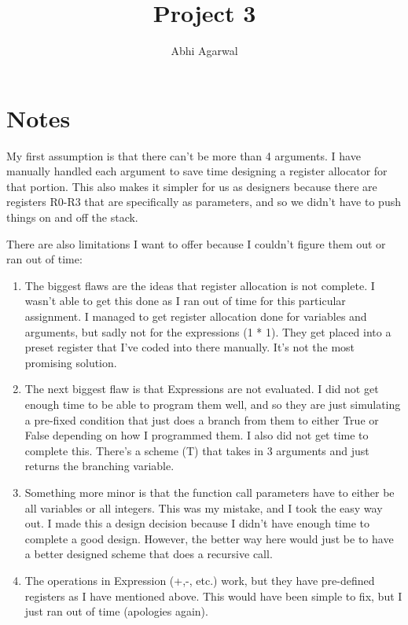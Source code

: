 \documentclass[11pt, oneside]{article}
\title{Project 3}
\author{Abhi Agarwal}
\date{}
\begin{document}
\maketitle

\section*{Notes}

\par My first assumption is that there can't be more than 4 arguments. I have manually handled each argument to save time designing a register allocator for that portion. This also makes it simpler for us as designers because there are registers R0-R3 that are specifically as parameters, and so we didn't have to push things on and off the stack. 
\par There are also limitations I want to offer because I couldn't figure them out or ran out of time:
\begin{enumerate}
\item The biggest flaws are the ideas that register allocation is not complete. I wasn't able to get this done as I ran out of time for this particular assignment. I managed to get register allocation done for variables and arguments, but sadly not for the expressions (1 * 1). They get placed into a preset register that I've coded into there manually. It's not the most promising solution.
\item The next biggest flaw is that Expressions are not evaluated. I did not get enough time to be able to program them well, and so they are just simulating a pre-fixed condition that just does a branch from them to either True or False depending on how I programmed them. I also did not get time to complete this. There's a scheme (T) that takes in 3 arguments and just returns the branching variable. 
\item Something more minor is that the function call parameters have to either be all variables or all integers. This was my mistake, and I took the easy way out. I made this a design decision because I didn't have enough time to complete a good design. However, the better way here would just be to have a better designed scheme that does a recursive call.
\item The operations in Expression (+,-, etc.) work, but they have pre-defined registers as I have mentioned above. This would have been simple to fix, but I just ran out of time (apologies again).
\end{enumerate}
\end{document}
